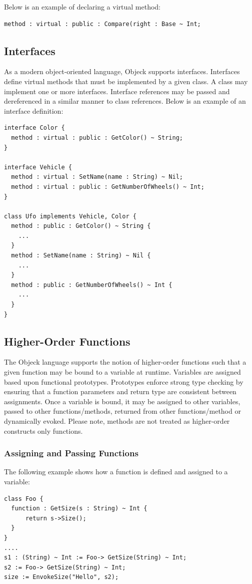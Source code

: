 \documentclass[12pt]{article}
\begin{document}
Below is an example of declaring a virtual method:
\begin{verbatim}
method : virtual : public : Compare(right : Base ~ Int;
\end{verbatim}

\subsection{Interfaces}
As a modern object-oriented language, Objeck supports interfaces.  Interfaces define virtual methods that must be implemented by a given class.  A class may implement one or more interfaces.  Interface references may be passed and dereferenced in a similar manner to class references.  Below is an example of an interface definition:

\begin{verbatim}
interface Color {
  method : virtual : public : GetColor() ~ String;
}

interface Vehicle {
  method : virtual : SetName(name : String) ~ Nil;
  method : virtual : public : GetNumberOfWheels() ~ Int;
}

class Ufo implements Vehicle, Color {
  method : public : GetColor() ~ String {
    ...
  }
  method : SetName(name : String) ~ Nil {
    ...
  }
  method : public : GetNumberOfWheels() ~ Int {
    ...
  }
}
\end{verbatim}

\subsection{Higher-Order Functions}
The Objeck language supports the notion of higher-order functions such that a given function may be bound to a variable at runtime.  Variables are assigned based upon functional prototypes.  Prototypes enforce strong type checking by ensuring that a function parameters and return type are consistent between assignments.  Once a variable is bound, it may be assigned to other variables, passed to other functions/methods, returned from other functions/method or dynamically evoked.  Please note, methods are not treated as higher-order constructs only functions.  

\subsubsection{Assigning and Passing Functions}
The following example shows how a function is defined and assigned to a variable:
\begin{verbatim}
class Foo {
  function : GetSize(s : String) ~ Int {
      return s->Size();
  }
}
....
s1 : (String) ~ Int := Foo-> GetSize(String) ~ Int;
s2 := Foo-> GetSize(String) ~ Int;
size := EnvokeSize("Hello", s2);
\end{verbatim}
\end{document}
